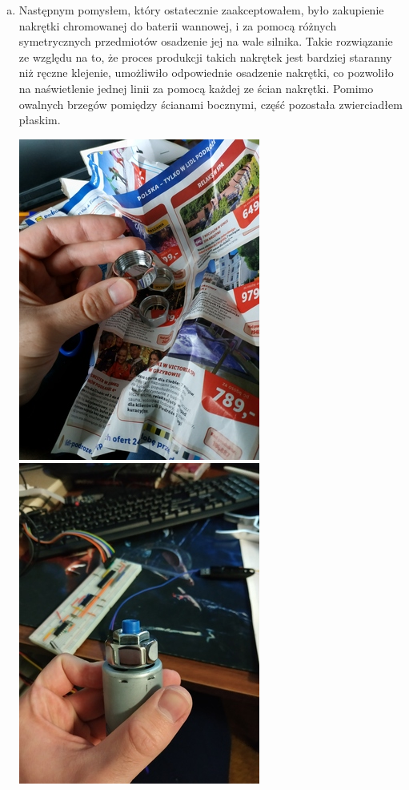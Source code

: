 \documentclass[a4paper,oneside,11pt]{report}
\begin{document}
\begin{enumerate}[1.]
\begin{enumerate}[a)]
\item Następnym pomysłem, który ostatecznie zaakceptowałem, było zakupienie nakrętki chromowanej do baterii wannowej, i za pomocą różnych symetrycznych przedmiotów osadzenie jej na wale silnika. Takie rozwiązanie ze względu na to, że proces produkcji takich nakrętek jest bardziej staranny niż ręczne klejenie, umożliwiło odpowiednie osadzenie nakrętki, co pozwoliło na naświetlenie jednej linii za pomocą każdej ze ścian nakrętki. Pomimo owalnych brzegów pomiędzy ścianami bocznymi, część pozostała zwierciadłem płaskim.

\includegraphics[scale=0.5]{images/5.jpg} 
\includegraphics[scale=0.5]{images/6.jpg} 

\end{enumerate}
\end{enumerate}
\end{document}
